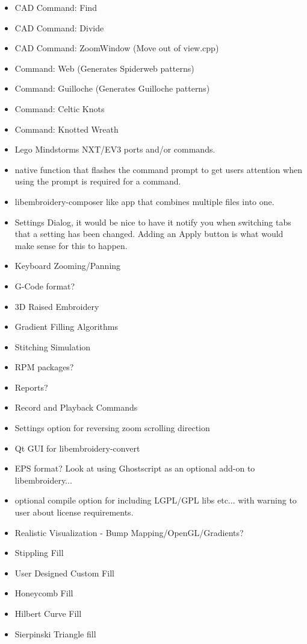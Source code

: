 \begin{itemize}
  \item CAD Command: Find
  \item CAD Command: Divide
  \item CAD Command: ZoomWindow (Move out of view.cpp)
  \item Command: Web (Generates Spiderweb patterns)
  \item Command: Guilloche (Generates Guilloche patterns)
  \item Command: Celtic Knots
  \item Command: Knotted Wreath
  \item Lego Mindstorms NXT/EV3 ports and/or commands.
  \item native function that flashes the command prompt to get users attention when using the prompt is required for a command.
  \item libembroidery-composer like app that combines multiple files into one.
  \item Settings Dialog, it would be nice to have it notify you when switching tabs that a setting has been changed. Adding an Apply button is what would make sense for this to happen.
  \item Keyboard Zooming/Panning
  \item G-Code format?
  \item 3D Raised Embroidery
  \item Gradient Filling Algorithms
  \item Stitching Simulation
  \item RPM packages?
  \item Reports?
  \item Record and Playback Commands
  \item Settings option for reversing zoom scrolling direction
  \item Qt GUI for libembroidery-convert
  \item EPS format? Look at using Ghostscript as an optional add-on to libembroidery...
  \item optional compile option for including LGPL/GPL libs etc... with warning to user about license requirements.
  \item Realistic Visualization - Bump Mapping/OpenGL/Gradients?
  \item Stippling Fill
  \item User Designed Custom Fill
  \item Honeycomb Fill
  \item Hilbert Curve Fill
  \item Sierpinski Triangle fill

\end{itemize}
